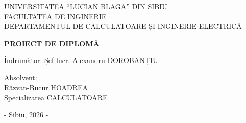 \documentclass[12pt,a4paper]{report}
\begin{document}
\pagestyle{empty}
\begingroup
\singlespacing
\setlength{\parindent}{0pt}
\setlength{\parskip}{0pt}

\begin{titlepage}
\thispagestyle{empty}

\begin{center}

\vspace*{0.5cm}

\vspace{0.6cm}

UNIVERSITATEA ``LUCIAN BLAGA'' DIN SIBIU\\
FACULTATEA DE INGINERIE\\
DEPARTAMENTUL DE CALCULATOARE ȘI INGINERIE ELECTRICĂ

\vspace{7.5cm}

{\huge \textbf{PROIECT DE DIPLOMĂ}}

\end{center}

\vspace{3cm}

\noindent
\begin{minipage}{0.75\textwidth}
Îndrumător: Șef lucr. Alexandru DOROBANȚIU
\end{minipage}

\vspace{2.5cm}

\hspace*{8.2cm}
\begin{minipage}{0.45\textwidth}
Absolvent:\\
Răzvan-Bucur HOADREA\\
Specializarea CALCULATOARE
\end{minipage}

\vfill

\begin{center}
- Sibiu, 2026 -
\end{center}

\end{titlepage}
\end{document}
